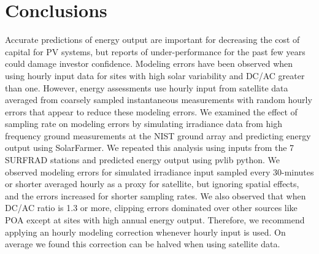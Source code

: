 \documentclass[conference]{IEEEtran}
\begin{document}
\section{Conclusions}
Accurate predictions of energy output are important for decreasing the cost of capital for PV systems, but reports of under-performance for the past few years could damage investor confidence. Modeling errors have been observed when using hourly input data for sites with high solar variability and DC/AC greater than one. However, energy assessments use hourly input from satellite data averaged from coarsely sampled instantaneous measurements with random hourly errors that appear to reduce these modeling errors. We examined the effect of sampling rate on modeling errors by simulating irradiance data from high frequency ground measurements at the NIST ground array and predicting energy output using SolarFarmer. We repeated this analysis using inputs from the 7 SURFRAD stations and predicted energy output using pvlib python. We observed modeling errors for simulated irradiance input sampled every 30-minutes or shorter averaged hourly as a proxy for satellite, but ignoring spatial effects, and the errors increased for shorter sampling rates. We also observed that when DC/AC ratio is 1.3 or more, clipping errors dominated over other sources like POA except at sites with high annual energy output. Therefore, we recommend applying an hourly modeling correction whenever hourly input is used. On average we found this correction can be halved when using satellite data.

\balance


\end{document}
